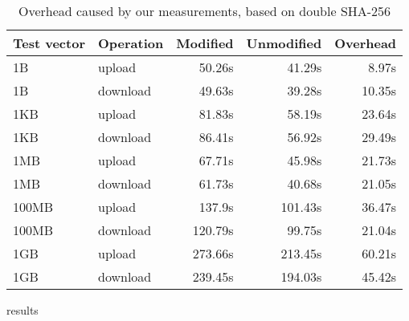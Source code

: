 \begin{table}
  \centering
  \begin{tabular}{ | l | l | r | r | r |}
    \hline
    \textbf{Test vector} & \textbf{Operation} & \textbf{Modified} & \textbf{Unmodified} & \textbf{Overhead} \\ \hline
    1B     &  upload    &  50.26s   &  41.29s   &  8.97s   \\  \hline
    1B     &  download  &  49.63s   &  39.28s   &  10.35s  \\  \hline
    1KB    &  upload    &  81.83s   &  58.19s   &  23.64s  \\  \hline
    1KB    &  download  &  86.41s   &  56.92s   &  29.49s  \\  \hline
    1MB    &  upload    &  67.71s   &  45.98s   &  21.73s  \\  \hline
    1MB    &  download  &  61.73s   &  40.68s   &  21.05s  \\  \hline
    100MB  &  upload    &  137.9s   &  101.43s  &  36.47s  \\  \hline
    100MB  &  download  &  120.79s  &  99.75s   &  21.04s  \\  \hline
    1GB    &  upload    &  273.66s  &  213.45s  &  60.21s  \\  \hline
    1GB    &  download  &  239.45s  &  194.03s  &  45.42s  \\  \hline

  \end{tabular}
  \caption{Overhead caused by our measurements, based on double \ac{SHA}-256}
  results
  \label{tbl:measure:overhead}
\end{table}
